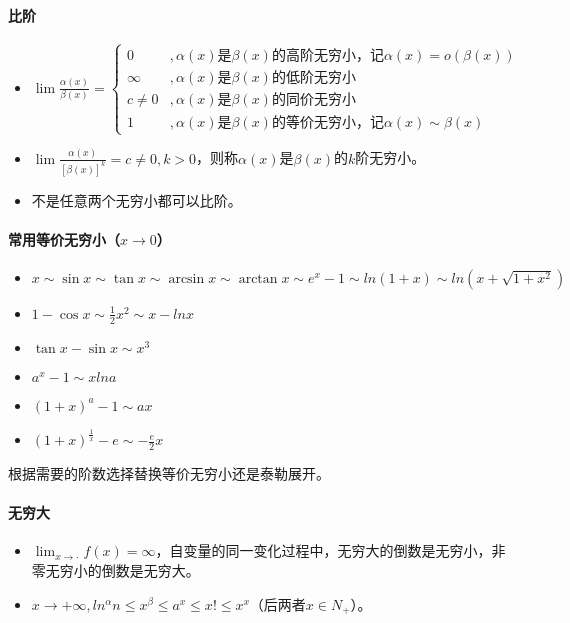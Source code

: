 \documentclass[
12pt, %
a4paper, 
oneside, %
headinclude,footinclude, %
]{scrartcl}
\begin{document}
\paragraph{比阶}
\begin{itemize}
\item 
$
\lim \frac{\alpha(x)}{\beta(x)}=
\begin{cases}
0 &, \alpha(x) \text{是} \beta(x) \text{的高阶无穷小，记} \alpha(x) = o(\beta(x)) \\
\infty &, \alpha(x) \text{是} \beta(x) \text{的低阶无穷小} \\
c \neq 0 &, \alpha(x) \text{是} \beta(x) \text{的同价无穷小} \\
1 &, \alpha(x) \text{是} \beta(x) \text{的等价无穷小，记} \alpha(x) \sim \beta(x)
\end{cases}
$
\item $ \lim \frac{\alpha(x)}{[\beta(x)]^k} = c \neq 0, k > 0 $，则称$ \alpha(x) $是$ \beta(x) $的$ k $阶无穷小。
\item 不是任意两个无穷小都可以比阶。
\end{itemize}
\paragraph{常用等价无穷小（$ x \rightarrow 0 $）}
\begin{itemize}
\item $ x \sim \sin x \sim \tan x \sim \arcsin x \sim \arctan x \sim e^x -1 \sim ln(1 + x) \sim ln(x + \sqrt{1 + x^2}) $
\item $ 1 - \cos x \sim \frac{1}{2}x^2 \sim x - lnx $
\item $ \tan x - \sin x \sim x^3 $
\item $ a^x -1 \sim x ln a $
\item $ (1 + x)^a - 1 \sim ax $
\item $ (1 + x)^{\frac{1}{x}} - e \sim -\frac{e}{2}x $
\end{itemize}

根据需要的阶数选择替换等价无穷小还是泰勒展开。
\paragraph{无穷大}
\begin{itemize}
\item $ \lim_{x \to \cdot} f(x) = \infty $，自变量的同一变化过程中，无穷大的倒数是无穷小，非零无穷小的倒数是无穷大。
\item $ x \rightarrow + \infty, ln^\alpha n \leq x^\beta \leq a^x \leq x! \leq x^x $（后两者$ x \in N_+ $）。
\end{itemize}
\end{document}

